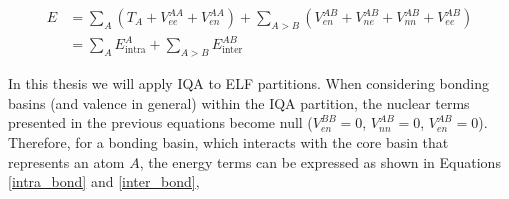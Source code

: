 \begin{align}
E&=\sum_A (T_A + V^{AA}_{ee} + V_{en}^{AA}) + \sum_{A > B} (V_{en}^{AB} + V_{ne}^{AB} + V_{nn}^{AB} + V_{ee}^{AB}) \\\nonumber
&=\sum_A E^A_{\mathrm{intra}} + \sum_{A>B} E_{\mathrm{inter}}^{AB}
\end{align}

%
%


%


In this thesis we will apply IQA to ELF partitions.
When considering bonding basins (and
valence in general) within the IQA partition, the nuclear terms presented in
the previous equations become null ($V_{en}^{BB}=0$, $V_{nn}^{AB}=0$,
$V_{en}^{AB}=0$). Therefore, for a bonding basin, which interacts
with the core basin that represents an atom $A$, the energy terms can
be expressed as shown in Equations \ref{intra_bond} and \ref{inter_bond},

